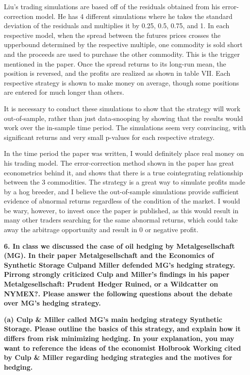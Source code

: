 \documentclass[11pt]{article}
\begin{document}
    Liu's trading simulations are based off of the residuals obtained from
his error-correction model. He has 4 different simulations where he
takes the standard deviation of the residuals and multiplies it by 0.25,
0.5, 0.75, and 1. In each respective model, when the spread between the
futures prices crosses the upperbound determined by the respective
multiple, one commodity is sold short and the proceeds are used to
purchase the other commodity. This is the trigger mentioned in the
paper. Once the spread returns to its long-run mean, the position is
reversed, and the profits are realized as shown in table VII. Each
respective strategy is shown to make money on average, though some
positions are entered for much longer than others.

It is necessary to conduct these simulations to show that the strategy
will work out-of-sample, rather than just data-snooping by showing that
the results would work over the in-sample time period. The simulations
seem very convincing, with significant returns and very small p-values
for each respective strategy.

In the time period the paper was written, I would definitely place real
money on his trading model. The error-correction method shown in the
paper has great econometrics behind it, and shows that there is a true
cointegrating relationship between the 3 commodities. The strategy is a
great way to simulate profits made by a hog breeder, and I believe the
out-of-sample simulations provide sufficient evidence of abnormal
returns regardless of the condition of the market. I would be wary,
however, to invest once the paper is published, as this would result in
many other traders searching for the same abnormal returns, which could
take away the arbitrage opportunity and result in 0 or negative profit.

    \textbf{6. In class we discussed the case of oil hedging by
Metalgesellschaft (MG). In their paper Metalgesellschaft and the
Economics of Synthetic Storage Culpand Miller defended MG's hedging
strategy. Pirrong strongly criticized Culp and Miller's findings in his
paper Metalgesellschaft: Prudent Hedger Ruined, or a Wildcatter on
NYMEX?. Please answer the following questions about the debate over MG's
hedging strategy.}

    \textbf{(a) Culp \& Miller called MG's main hedging strategy Synthetic
Storage. Please outline the basics of this strategy, and explain how it
differs from risk minimizing hedging. In your explanation, you may want
to reference the ideas of the economist Holbrook Working cited by Culp
\& Miller regarding hedging strategies and the motives for hedging.}
\end{document}
